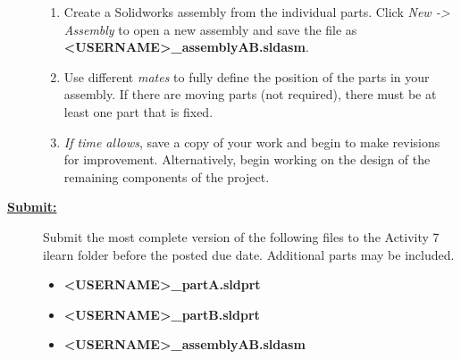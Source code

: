 \documentclass[12pt]{article}
\newcommand{\ANUM}{7} %
\begin{document}
\begin{description}
\begin{enumerate}
	
	\item Create a Solidworks assembly from the individual parts. Click {\it New -> Assembly} to open a new assembly and save the file as {\bf \BL<USERNAME>\BK\_assemblyAB.sldasm}. 
	
	\item Use different {\it mates} to fully define the position of the parts in your assembly. If there are moving parts (not required), there must be at least one part that is fixed.
	
	\item {\it If time allows}, save a copy of your work and begin to make revisions for improvement. Alternatively, begin working on the design of the remaining components of the project. 
\end{enumerate}

\item[\textbf{\underline{Submit:}}] \hfill \vspace{0mm}

		Submit the most complete version of the following files to the Activity \ANUM \hspace{1mm} ilearn folder before the posted due date.  Additional parts may be included.
		\begin{itemize}
			\item {\bf \BL<USERNAME>\BK\_partA.sldprt}
			\item {\bf \BL<USERNAME>\BK\_partB.sldprt}
			\item {\bf \BL<USERNAME>\BK\_assemblyAB.sldasm}
			
		\end{itemize}  

\end{description}
\end{document}
